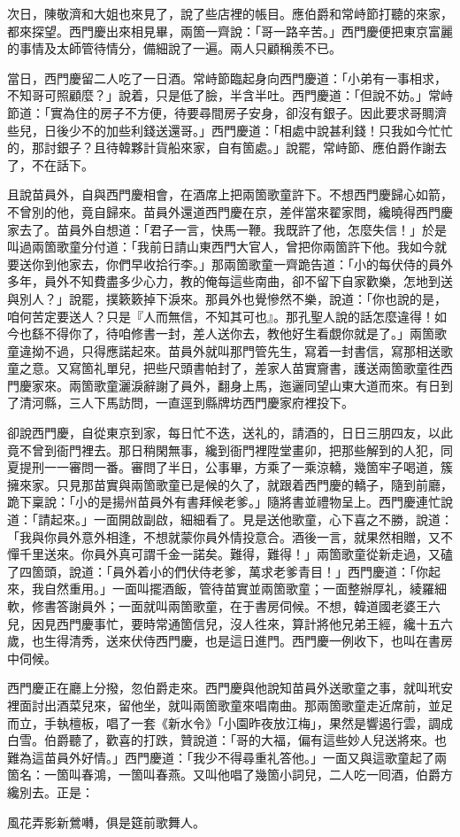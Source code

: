 次日，陳敬濟和大姐也來見了，說了些店裡的帳目。應伯爵和常峙節打聽的來家，都來探望。西門慶出來相見畢，兩箇一齊說：「哥一路辛苦。」西門慶便把東京富麗的事情及太師管待情分，備細說了一遍。兩人只顧稱羨不已。

當日，西門慶留二人吃了一日酒。常峙節臨起身向西門慶道：「小弟有一事相求，不知哥可照顧麼？」說着，只是低了臉，半含半吐。{}西門慶道：「但說不妨。」常峙節道：「實為住的房子不方便，待要尋間房子安身，卻沒有銀子。因此要求哥賙濟些兒，日後少不的加些利錢送還哥。」西門慶道：「相處中說甚利錢！只我如今忙忙的，那討銀子？且待韓夥計貨船來家，自有箇處。」說罷，常峙節、應伯爵作謝去了，不在話下。

且說苗員外，自與西門慶相會，在酒席上把兩箇歌童許下。不想西門慶歸心如箭，不曾別的他，竟自歸來。苗員外還道西門慶在京，差伴當來翟家問，纔曉得西門慶家去了。苗員外自想道：「君子一言，快馬一鞭。我既許了他，怎麼失信！」於是叫過兩箇歌童分付道：「我前日請山東西門大官人，曾把你兩箇許下他。我如今就要送你到他家去，你們早收拾行李。」那兩箇歌童一齊跪告道：「小的每伏侍的員外多年，員外不知費盡多少心力，教的俺每這些南曲，卻不留下自家歡樂，怎地到送與別人？」說罷，撲簌簌掉下淚來。那員外也覺慘然不樂，說道：「你也說的是，咱何苦定要送人？只是『人而無信，不知其可也』。那孔聖人說的話怎麼違得！如今也繇不得你了，待咱修書一封，差人送你去，{}教他好生看覷你就是了。」兩箇歌童違拗不過，只得應諾起來。苗員外就叫那門管先生，寫着一封書信，寫那相送歌童之意。又寫箇礼單兒，把些尺頭書帕封了，差家人苗實齎書，護送兩箇歌童徃西門慶家來。兩箇歌童灑淚辭謝了員外，翻身上馬，迤邐同望山東大道而來。有日到了清河縣，三人下馬訪問，一直逕到縣牌坊西門慶家府裡投下。

卻說西門慶，自從東京到家，每日忙不迭，送礼的，請酒的，日日三朋四友，以此竟不曾到衙門裡去。那日稍閑無事，纔到衙門裡陞堂畫卯，把那些解到的人犯，同夏提刑一一審問一番。審問了半日，公事畢，方乘了一乘涼轎，幾箇牢子喝道，簇擁來家。只見那苗實與兩箇歌童已是候的久了，就跟着西門慶的轎子，隨到前廳，跪下稟說：「小的是揚州苗員外有書拜候老爹。」隨將書並禮物呈上。西門慶連忙說道：「請起來。」一面開啟副啟，細細看了。見是送他歌童，心下喜之不勝，說道：「我與你員外意外相逢，不想就蒙你員外情投意合。酒後一言，就果然相贈，又不憚千里送來。你員外真可謂千金一諾矣。難得，難得！」兩箇歌童從新走過，又磕了四箇頭，說道：「員外着小的們伏侍老爹，萬求老爹青目！」西門慶道：「你起來，我自然重用。」一面叫擺酒飯，管待苗實並兩箇歌童；一面整辦厚礼，綾羅細軟，修書答謝員外；一面就叫兩箇歌童，在于書房伺候。不想，韓道國老婆王六兒，因見西門慶事忙，要時常通箇信兒，沒人徃來，算計將他兄弟王經，纔十五六歲，也生得清秀，送來伏侍西門慶，也是這日進門。西門慶一例收下，也叫在書房中伺候。

西門慶正在廳上分撥，忽伯爵走來。西門慶與他說知苗員外送歌童之事，就叫玳安裡面討出酒菜兒來，留他坐，就叫兩箇歌童來唱南曲。那兩箇歌童走近席前，並足而立，手執檀板，唱了一套《新水令》「小園昨夜放江梅」，果然是響遏行雲，調成白雪。伯爵聽了，歡喜的打跌，贊說道：「哥的大福，偏有這些妙人兒送將來。也難為這苗員外好情。」西門慶道：「我少不得尋重礼答他。」一面又與這歌童起了兩箇名：一箇叫春鴻，一箇叫春燕。又叫他唱了幾箇小詞兒，二人吃一囘酒，伯爵方纔別去。正是：

\begin{myquote}
風花弄影新鶯囀，俱是筵前歌舞人。
\end{myquote}

